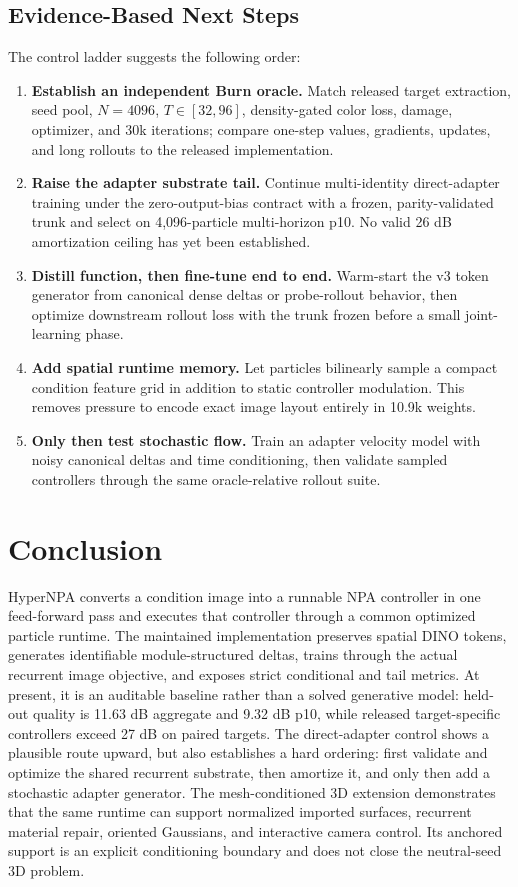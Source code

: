 \documentclass[sigconf,nonacm]{acmart}
\begin{document}
\subsection{Evidence-Based Next Steps}

The control ladder suggests the following order:
\begin{enumerate}
  \item \textbf{Establish an independent Burn oracle.} Match released target
  extraction, seed pool, $N=4096$, $T\in[32,96]$, density-gated color loss,
  damage, optimizer, and 30k iterations; compare one-step values, gradients,
  updates, and long rollouts to the released implementation.
  \item \textbf{Raise the adapter substrate tail.} Continue multi-identity
  direct-adapter training under the zero-output-bias contract with a frozen,
  parity-validated trunk and select on 4,096-particle multi-horizon p10. No
  valid 26 dB amortization ceiling has yet been established.
  \item \textbf{Distill function, then fine-tune end to end.} Warm-start the
  v3 token generator from canonical dense deltas or probe-rollout behavior,
  then optimize downstream rollout loss with the trunk frozen before a small
  joint-learning phase.
  \item \textbf{Add spatial runtime memory.} Let particles bilinearly sample a
  compact condition feature grid in addition to static controller modulation.
  This removes pressure to encode exact image layout entirely in 10.9k weights.
  \item \textbf{Only then test stochastic flow.} Train an adapter velocity
  model with noisy canonical deltas and time conditioning, then validate sampled
  controllers through the same oracle-relative rollout suite.
\end{enumerate}

\section{Conclusion}

HyperNPA converts a condition image into a runnable NPA controller in one
feed-forward pass and executes that controller through a common optimized
particle runtime. The maintained implementation preserves spatial DINO tokens,
generates identifiable module-structured deltas, trains through the actual
recurrent image objective, and exposes strict conditional and tail metrics.
At present, it is an auditable baseline rather than a solved generative model:
held-out quality is 11.63 dB aggregate and 9.32 dB p10, while released
target-specific controllers exceed 27 dB on paired targets. The direct-adapter
control shows a plausible route upward, but also establishes a hard ordering:
first validate and optimize the shared recurrent substrate, then amortize it,
and only then add a stochastic adapter generator.
The mesh-conditioned 3D extension demonstrates that the same runtime can
support normalized imported surfaces, recurrent material repair, oriented
Gaussians, and interactive camera control. Its anchored support is an explicit
conditioning boundary and does not close the neutral-seed 3D problem.
\end{document}
